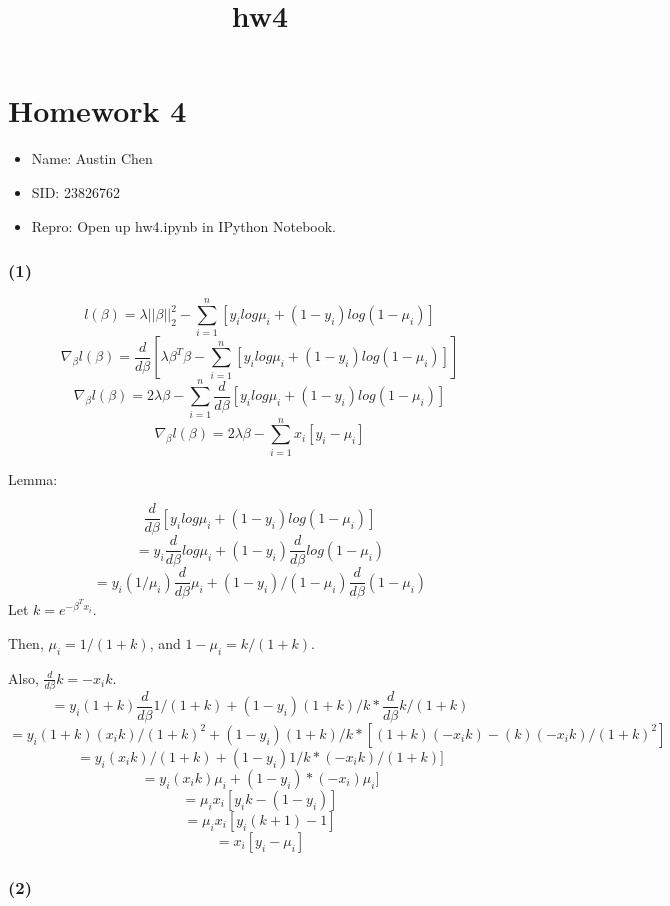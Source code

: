 \documentclass{article}
\title{hw4}
\begin{document}
    
    
    \maketitle
    
    

    
    \section{Homework 4}\label{homework-4}

\begin{itemize}
\itemsep1pt\parskip0pt
\item
  Name: Austin Chen
\item
  SID: 23826762
\item
  Repro: Open up hw4.ipynb in IPython Notebook.
\end{itemize}

    \subsubsection{(1)}\label{section}

\[l(\beta) = \lambda||\beta||_2^2 - \sum\limits_{i=1}^n [y_i log \mu_i + (1-y_i) log(1-\mu_i)]\]
\[\nabla_\beta l(\beta) = \frac{d}{d\beta}[\lambda \beta^T \beta - \sum\limits_{i=1}^n [y_i log \mu_i + (1-y_i) log(1-\mu_i)]]\]
\[\nabla_\beta l(\beta) = 2\lambda \beta - \sum\limits_{i=1}^n \frac{d}{d\beta}[y_i log \mu_i + (1-y_i) log(1-\mu_i)]\]
\[\nabla_\beta l(\beta) = 2\lambda \beta - \sum\limits_{i=1}^n x_i [y_i - \mu_i]\]

Lemma:

\[\frac{d}{d\beta} [y_i log \mu_i + (1-y_i) log(1-\mu_i)]\]
\[=y_i \frac{d}{d\beta} log \mu_i + (1-y_i) \frac{d}{d\beta} log(1-\mu_i)\]
\[=y_i (1 / \mu_i) \frac{d}{d\beta} \mu_i + (1-y_i) / (1-\mu_i) \frac{d}{d\beta} (1-\mu_i)\]
Let \(k = e^{-\beta^T x_i}\).

Then, \(\mu_i = 1 / (1+k)\), and \(1-\mu_i = k / (1+k)\).

Also, \(\frac{d}{d\beta} k = - x_i k\).
\[=y_i (1 + k) \frac{d}{d\beta} 1 / (1+k) + (1-y_i) (1+k)/k *\frac{d}{d\beta} k / (1+k)\]
\[=y_i (1 + k) (x_i k) / (1+k)^2 + (1-y_i) (1+k)/k * [(1+k)(-x_i k) - (k)(-x_i k) / (1+k)^2]\]
\[=y_i (x_i k) / (1+k) + (1-y_i) 1/k * (-x_i k) / (1+k)]\]
\[=y_i (x_i k) \mu_i + (1-y_i) * (-x_i) \mu_i]\]
\[=\mu_i x_i [y_i k - (1-y_i)]\] \[=\mu_i x_i [y_i (k + 1) - 1]\]
\[=x_i [y_i - \mu_i]\]

    \subsubsection{(2)}\label{section}
\end{document}
